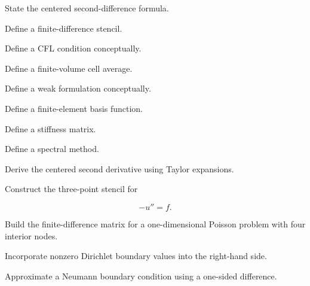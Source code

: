 \begin{exercise}[1]
State the centered second-difference formula.
\end{exercise}

\begin{exercise}[1]
Define a finite-difference stencil.
\end{exercise}

\begin{exercise}[1]
Define a CFL condition conceptually.
\end{exercise}

\begin{exercise}[1]
Define a finite-volume cell average.
\end{exercise}

\begin{exercise}[1]
Define a weak formulation conceptually.
\end{exercise}

\begin{exercise}[1]
Define a finite-element basis function.
\end{exercise}

\begin{exercise}[1]
Define a stiffness matrix.
\end{exercise}

\begin{exercise}[1]
Define a spectral method.
\end{exercise}

\begin{exercise}[2]
Derive the centered second derivative using Taylor expansions.
\end{exercise}

\begin{exercise}[2]
Construct the three-point stencil for

\[
-u''=f.
\]
\end{exercise}

\begin{exercise}[3]
Build the finite-difference matrix for a one-dimensional Poisson problem
with four interior nodes.
\end{exercise}

\begin{exercise}[3]
Incorporate nonzero Dirichlet boundary values into the right-hand side.
\end{exercise}

\begin{exercise}[3]
Approximate a Neumann boundary condition using a one-sided difference.
\end{exercise}

